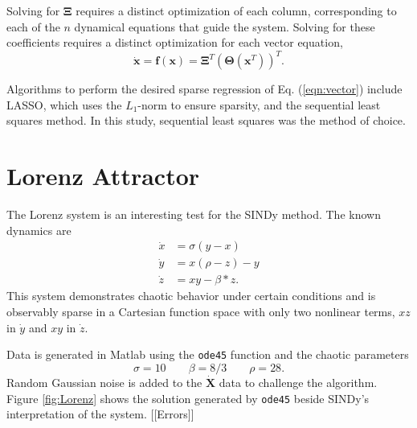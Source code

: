 \documentclass[12pt,preprintnumbers,amsmath,amssymb,titlepage]{report}
\newcommand{\refe}[1]{Eq. (\ref{#1})}
\begin{document}
Solving for $\bm{\Xi}$ requires a distinct optimization of each column, corresponding to each of the $n$ dynamical equations that guide the system. 
Solving for these coefficients requires a distinct optimization for each vector equation, 
\begin{equation} \label{eqn:vector}
	\bm{\dot{x}} = \bm{f}(\bm{x}) = \bm{\Xi}^T(\bm{\Theta}(\bm{x}^T))^T.
\end{equation}

Algorithms to perform the desired sparse regression of \refe{eqn:vector} include LASSO, which uses the $L_1$-norm to ensure sparsity, and the sequential least squares method. In this study, sequential least squares was the method of choice.





\section*{Lorenz Attractor}
The Lorenz system is an interesting test for the SINDy method. The known dynamics are 
\begin{align}
	\dot{x} &= \sigma(y - x) \\
	\dot{y} &= x(\rho - z) - y \\
	\dot{z} &= xy - \beta * z.
\end{align}
This system demonstrates chaotic behavior under certain conditions and is observably sparse in a Cartesian function space with only two nonlinear terms, $xz$ in $\dot{y}$ and $xy$ in $\dot{z}$. 

Data is generated in Matlab using the \verb|ode45| function and the chaotic parameters
\begin{equation}
	\sigma=10 \qquad \beta=8/3 \qquad \rho=28.
\end{equation} 
Random Gaussian noise is added to the $\bm{\dot{X}}$ data to challenge the algorithm. Figure \ref{fig:Lorenz} shows the solution generated by \verb|ode45| beside SINDy's interpretation of the system. [[Errors]]
\end{document}
